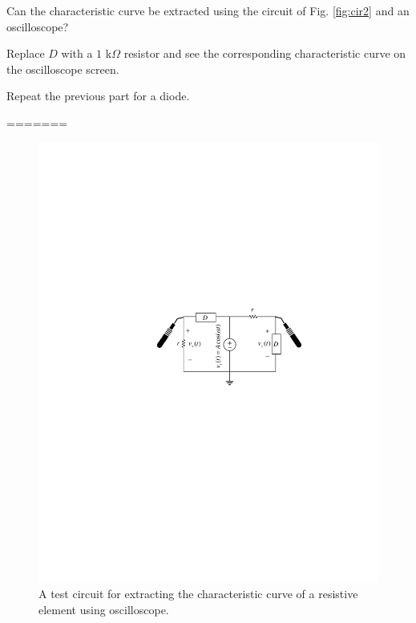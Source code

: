 \documentclass[11pt]{article}
\begin{document}
\begin{question}
\begin{subquestion}{Can the characteristic curve be extracted using the circuit of Fig. \ref{fig:cir2} and an oscilloscope? } 
\answer{}
\end{subquestion}

\begin{subquestion}{Replace $D$ with a $1$ k$\Omega$ resistor and see the corresponding characteristic curve on the oscilloscope screen.} 
\answer{}
\end{subquestion}

\begin{subquestion}{Repeat the previous part for a diode.} 
\answer{}
\end{subquestion}
=======

    \begin{figure}[H]
        \centering
        \includegraphics[scale=1.2,angle=0]{Fig/cir3.pdf}
        \caption{A test circuit for extracting the characteristic curve of a resistive element using oscilloscope.} \label{fig:cir3}
    \end{figure}


\end{question}
\end{document}
